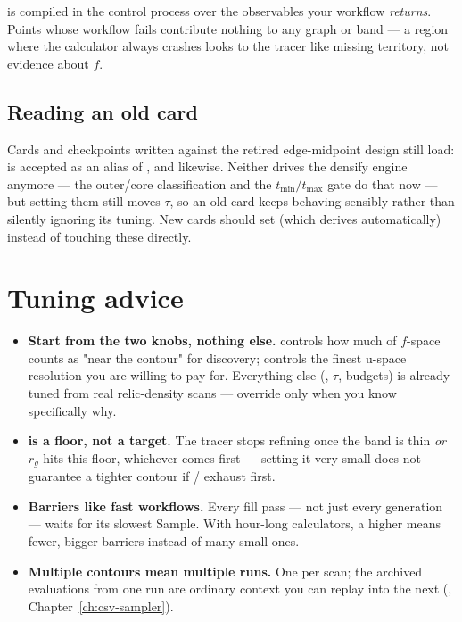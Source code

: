 \begin{jwarn}
 is compiled in the control process over the observables
your workflow \emph{returns}. Points whose workflow fails contribute nothing to any
graph or band --- a region where the calculator always crashes looks to the tracer like
missing territory, not evidence about $f$.
\end{jwarn}

\subsection{Reading an old card}
\label{sec:als-legacy}

Cards and checkpoints written against the retired edge-midpoint design still load:
 is accepted as an alias of , and
 likewise. Neither drives the densify engine anymore ---
the outer/core classification and the $t_{\min}/t_{\max}$ gate do that now --- but
setting them still moves $\tau$, so an old card keeps behaving sensibly rather than
silently ignoring its tuning. New cards should set  (which
derives  automatically) instead of touching these directly.

\section{Tuning advice}

\begin{itemize}
  \item \textbf{Start from the two knobs, nothing else.} 
        controls how much of $f$-space counts as "near the contour" for discovery;
         controls the finest u-space resolution you are willing to
        pay for. Everything else (, $\tau$, budgets) is
        already tuned from real relic-density scans --- override only when you know
        specifically why.
  \item \textbf{ is a floor, not a target.} The tracer stops
        refining once the band is thin \emph{or} $r_g$ hits this floor, whichever comes
        first --- setting it very small does not guarantee a tighter contour if
        / exhaust first.
  \item \textbf{Barriers like fast workflows.} Every fill pass --- not just every
        generation --- waits for its slowest Sample. With hour-long calculators, a
        higher  means fewer, bigger barriers instead
        of many small ones.
  \item \textbf{Multiple contours mean multiple runs.} One  per
        scan; the archived evaluations from one run are ordinary context you can replay
        into the next (, Chapter~\ref{ch:csv-sampler}).
\end{itemize}

